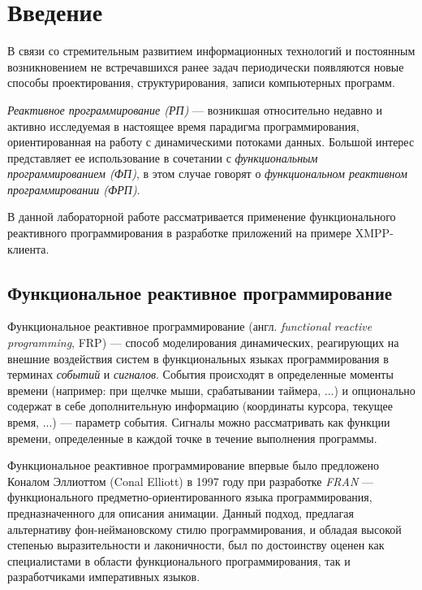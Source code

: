 \section*{Введение}
В связи со стремительным развитием информационных технологий и постоянным возникновением
не встречавшихся ранее задач периодически появляются новые способы проектирования, структурирования,
записи компьютерных программ.

\emph{Реактивное программирование (РП)} — возникшая относительно
недавно и активно исследуемая в настоящее время парадигма программирования, ориентированная
на работу с динамическими потоками данных. Большой интерес представляет ее использование
в сочетании с \emph{функциональным программированием (ФП)}, в этом случае говорят о
\emph{функциональном реактивном программировании (ФРП)}.

В данной лабораторной работе рассматривается применение функционального реактивного программирования
в разработке приложений на примере XMPP-клиента\cite{xmpp}.

\subsection*{Функциональное реактивное программирование}
Функциональное реактивное программирование (англ. \emph{functional reactive programming}, FRP)
--- способ моделирования динамических, реагирующих на внешние воздействия систем
в функциональных языках программирования в терминах \emph{событий} и \emph{сигналов}\cite{amsdensurvey}.
События происходят в определенные моменты времени (например: при щелчке мыши, срабатывании таймера, ...)
и опционально содержат в себе дополнительную информацию (координаты курсора, текущее время, ...) — параметр события.
Сигналы можно рассматривать как функции времени, определенные в каждой точке в течение выполнения программы.

Функциональное реактивное программирование впервые было предложено Коналом Эллиоттом (Conal Elliott)
в 1997 году при разработке \emph{FRAN}\cite{fran} --- функционального предметно-ориентированного языка программирования,
предназначенного для описания анимации.
Данный подход, предлагая альтернативу фон-неймановскому стилю программирования, и обладая
высокой степенью выразительности и лаконичности, был по достоинству оценен как
специалистами в области функционального программирования\cite{modsynth,robotics},
так и разработчиками императивных языков\cite{csrx}.
